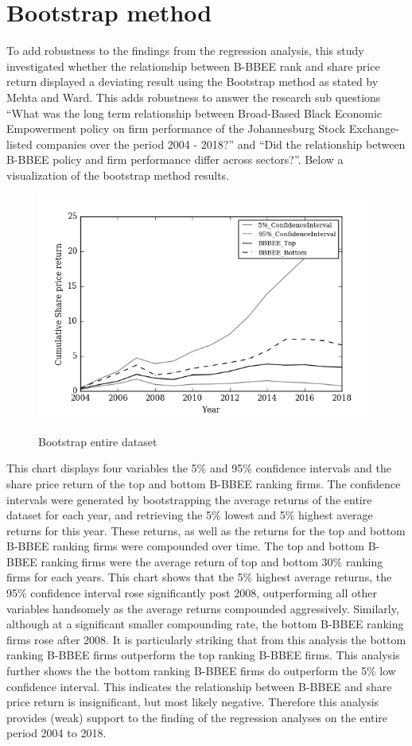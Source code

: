 \section{Bootstrap method}
To add robustness to the findings from the regression analysis, this study investigated whether the relationship between B-BBEE rank and share price return displayed a deviating result using the Bootstrap method as stated by Mehta and Ward. This adds robustness to answer the research sub questions “What was the long term relationship between Broad-Based Black Economic Empowerment policy on firm performance of the Johannesburg Stock Exchange-listed companies over the period 2004 - 2018?” and  “Did the relationship between B-BBEE policy and firm performance differ across sectors?”. Below a visualization of the bootstrap method results.
\begin{figure}[H]
  \centering
  \includegraphics [scale=1]{Images/Bootstrap_All.png} \\
  {\small {\it \caption{Bootstrap entire dataset \label{fig:moun} }}}
\end{figure}
This chart displays four variables the 5\% and 95\% confidence intervals and the share price return of the top and bottom B-BBEE ranking firms. The confidence intervals were generated by bootstrapping the average returns of the entire dataset for each year, and retrieving the 5\% lowest and 5\% highest average returns for this year. These returns, as well as the returns for the top and bottom B-BBEE ranking firms were compounded over time. The top and bottom B-BBEE ranking firms were the average return of top and bottom 30\% ranking firms for each years. This chart shows that the 5\% highest average returns, the 95\% confidence interval rose significantly post 2008, outperforming all other variables handsomely as the average returns compounded aggressively. Similarly, although at a significant smaller compounding rate, the bottom B-BBEE ranking firms rose after 2008. It is particularly striking that from this analysis the bottom ranking B-BBEE firms outperform the top ranking B-BBEE firms. This analysis further shows the the bottom ranking B-BBEE firms do outperform the 5\% low confidence interval. This indicates the relationship between B-BBEE and share price return is insignificant, but most likely negative. Therefore this analysis provides (weak) support to the finding of the regression analyses on the entire period 2004 to 2018.

